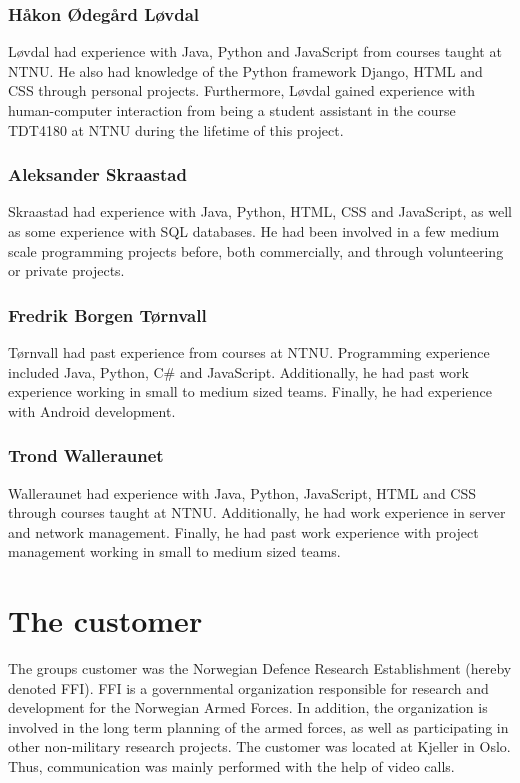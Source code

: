 \subsubsection{Håkon Ødegård Løvdal}

Løvdal had experience with Java, Python and JavaScript from courses taught at NTNU. He also had knowledge of the Python framework Django, HTML and CSS through personal projects. Furthermore, Løvdal gained experience with human-computer interaction from being a student assistant in the course TDT4180 at NTNU during the lifetime of this project. 

\subsubsection{Aleksander Skraastad}

Skraastad had experience with Java, Python, HTML, CSS and JavaScript, as well as some experience with SQL databases. He had been involved in a few medium scale programming projects before, both commercially, and through volunteering or private projects.

\subsubsection{Fredrik Borgen Tørnvall}

Tørnvall had past experience from courses at NTNU. Programming experience included Java, Python, C\# and JavaScript. Additionally, he had past work experience working in small to medium sized teams. Finally, he had experience with Android development. 

\subsubsection{Trond Walleraunet}

Walleraunet had experience with Java, Python, JavaScript, HTML and CSS through courses taught at NTNU. Additionally, he had work experience in server and network management. Finally, he had past work experience with project management working in small to medium sized teams.


\section{The customer}
\label{sec:introduction-the_customer}

The groups customer was the Norwegian Defence Research Establishment (hereby denoted FFI). FFI is a governmental organization responsible for research and development for the Norwegian Armed Forces. In addition, the organization is involved in the long term planning of the armed forces, as well as participating in other non-military research projects. The customer was located at Kjeller in Oslo. Thus, communication was mainly performed with the help of video calls.

